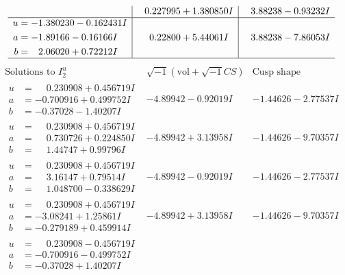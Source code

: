 \documentclass[1p]{elsarticle_modified}
\theoremstyle{definition}
\newcommand{\I}{\sqrt{-1}}
\begin{document}
$$\begin{array}{c|c|c}
 & \phantom{-}0.227995 + 1.380850 I & \phantom{-}3.88238 - 0.93232 I \\ \hline\begin{aligned}
u &= -1.380230 - 0.162431 I \\
a &= -1.89166 - 0.16166 I \\
b &= \phantom{-}2.06020 + 0.72212 I\end{aligned}
 & \phantom{-}0.22800 + 5.44061 I & \phantom{-}3.88238 - 7.86053 I\\
 \hline 
 \end{array}$$\newpage$$\begin{array}{c|c|c}  
\text{Solutions to }I^u_{2}& \I (\text{vol} + \sqrt{-1}CS) & \text{Cusp shape}\\
 \hline 
\begin{aligned}
u &= \phantom{-}0.230908 + 0.456719 I \\
a &= -0.700916 + 0.499752 I \\
b &= -0.37028 - 1.40207 I\end{aligned}
 & -4.89942 - 0.92019 I & -1.44626 - 2.77537 I \\ \hline\begin{aligned}
u &= \phantom{-}0.230908 + 0.456719 I \\
a &= \phantom{-}0.730726 + 0.224850 I \\
b &= \phantom{-}1.44747 + 0.99796 I\end{aligned}
 & -4.89942 + 3.13958 I & -1.44626 - 9.70357 I \\ \hline\begin{aligned}
u &= \phantom{-}0.230908 + 0.456719 I \\
a &= \phantom{-}3.16147 + 0.79514 I \\
b &= \phantom{-}1.048700 - 0.338629 I\end{aligned}
 & -4.89942 - 0.92019 I & -1.44626 - 2.77537 I \\ \hline\begin{aligned}
u &= \phantom{-}0.230908 + 0.456719 I \\
a &= -3.08241 + 1.25861 I \\
b &= -0.279189 + 0.459914 I\end{aligned}
 & -4.89942 + 3.13958 I & -1.44626 - 9.70357 I \\ \hline\begin{aligned}
u &= \phantom{-}0.230908 - 0.456719 I \\
a &= -0.700916 - 0.499752 I \\
b &= -0.37028 + 1.40207 I\end{aligned}

\end{array}$$
\end{document}
